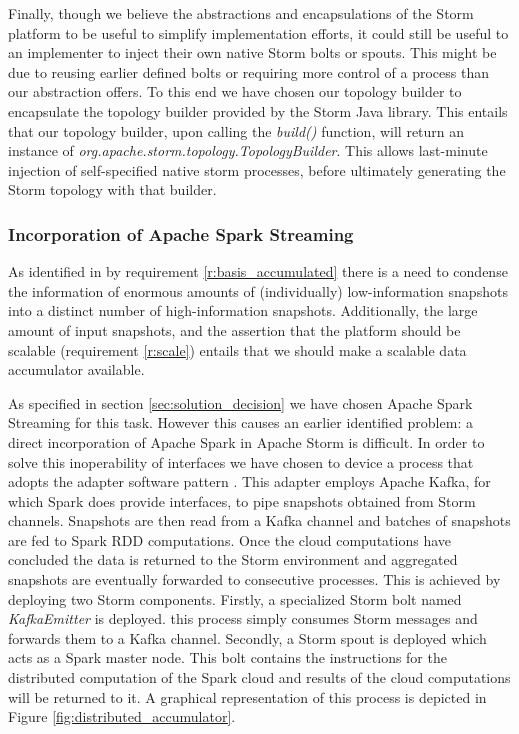 Finally, though we believe the abstractions and encapsulations of the Storm platform to be useful to simplify implementation efforts, it could still be useful to an implementer to inject their own native Storm bolts or spouts. This might be due to reusing earlier defined bolts or requiring more control of a process than our abstraction offers. To this end we have chosen our topology builder to encapsulate the topology builder provided by the Storm Java library. This entails that our topology builder, upon calling the \emph{build()} function, will return an instance of \emph{org.apache.storm.topology.TopologyBuilder}. This allows last-minute injection of self-specified native storm processes, before ultimately generating the Storm topology with that builder.

\subsubsection*{Incorporation of Apache Spark Streaming}
\label{sec:incorporation_spark}
As identified in by requirement \ref{r:basis_accumulated} there is a need to condense the information of enormous amounts of (individually) low-information snapshots into a distinct number of high-information snapshots. Additionally, the large amount of input snapshots, and the assertion that the platform should be scalable (requirement \ref{r:scale}) entails that we should make a scalable data accumulator available. 

As specified in section \ref{sec:solution_decision} we have chosen Apache Spark Streaming for this task. However this causes an earlier identified problem: a direct incorporation of Apache Spark in Apache Storm is difficult. In order to solve this inoperability of interfaces we have chosen to device a process that adopts the adapter software pattern \cite{search_ref}. This adapter employs Apache Kafka, for which Spark does provide interfaces, to pipe snapshots obtained from Storm channels. Snapshots are then read from a Kafka channel and batches of snapshots are fed to Spark RDD computations. Once the cloud computations have concluded the data is returned to the Storm environment and aggregated snapshots are eventually forwarded to consecutive processes. This is achieved by deploying two Storm components. Firstly, a specialized Storm bolt named \emph{KafkaEmitter} is deployed. this process simply consumes Storm messages and forwards them to a Kafka channel. Secondly, a Storm spout is deployed which acts as a Spark master node. This bolt contains the instructions for the distributed computation of the Spark cloud and results of the cloud computations will be returned to it. A graphical representation of this process is depicted in Figure \ref{fig:distributed_accumulator}.

